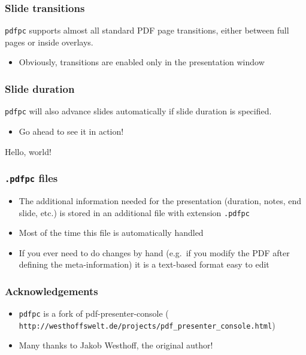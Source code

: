 \documentclass{beamer}
\newcommand{\singleitem}[1]{\begin{itemize}\item #1\end{itemize}}
\newcommand{\pdfpc}{\texttt{pdfpc}\xspace}
\newcommand{\opt}[1]{\texttt{#1}\xspace}
\begin{document}
\begin{frame}
  \frametitle{Slide transitions}

  \pdfpc supports almost all standard PDF page transitions, either between full
  pages or inside overlays.

  \singleitem{Obviously, transitions are enabled only in the presentation
    window}


\end{frame}

\begin{frame}
  \frametitle{Slide duration}

  \pdfpc will also advance slides automatically if slide duration is specified.
  \singleitem{Go ahead to see it in action!}
  \vskip 1cm

  {\Huge\hfill
  Hello,
  world!
  \hfill}
\end{frame}

\begin{frame}
  \frametitle{\opt{.pdfpc} files}
  \begin{itemize}
    \item The additional information needed for the presentation (duration,
      notes, end slide, etc.) is stored in an additional file with extension
      \opt{.pdfpc}
    \item Most of the time this file is automatically handled
    \item If you ever need to do changes by hand (e.g.\ if you modify the PDF
      after defining the meta-information) it is a text-based format easy to
      edit
  \end{itemize}
\end{frame}

\begin{frame}[fragile]
  \frametitle{Acknowledgements}
  \begin{itemize}
    \item \pdfpc is a fork of pdf-presenter-console
      ({\footnotesize
        \verb+http://westhoffswelt.de/projects/pdf_presenter_console.html+})
    \item Many thanks to Jakob Westhoff, the original author!
  \end{itemize}
\end{frame}
\end{document}
